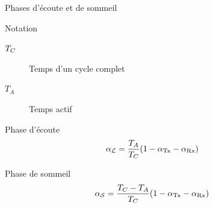 \begin{frame}{Phases d'écoute et de sommeil}

  \begin{block}{Notation}
    \begin{description}
      \item[$T_{C}$] Temps d'un cycle complet
      \item[$T_{A}$] Temps actif
    \end{description}
  \end{block}


  \begin{alertblock}{Phase d'écoute}
    \begin{align}
      \alpha_{\mathcal{L}} &= \frac{T_{A}}{T_{C}}(1 - \alpha_{\textrm{Tx}} - \alpha_{\textrm{Rx}})
    \end{align}
  \end{alertblock}
  \begin{alertblock}{Phase de sommeil}
    \begin{align}
      \alpha_{\mathcal{S}} &= \frac{T_{C} - T_{A}}{T_{C}}(1 - \alpha_{\textrm{Tx}} - \alpha_{\textrm{Rx}})
    \end{align}
  \end{alertblock}

\end{frame}

